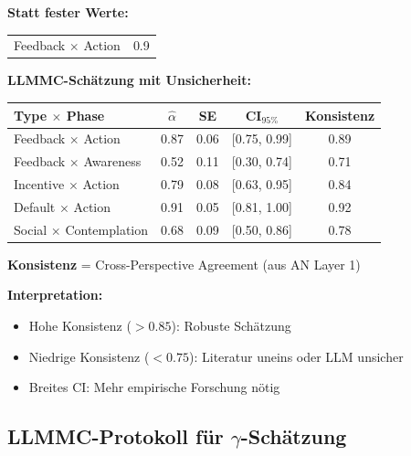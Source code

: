 \begin{tcolorbox}[colback=yellow!5!white, colframe=yellow!75!black,
    title=\textbf{Beispiel: LLMMC-geschätzte HHH-T5-Matrix (Phase-Affinity)}]

\textbf{Statt fester Werte:}
\begin{center}
\begin{tabular}{@{}lc@{}}
Feedback $\times$ Action & 0.9 \\
\end{tabular}
\end{center}

\textbf{LLMMC-Schätzung mit Unsicherheit:}
\begin{center}
\renewcommand{\arraystretch}{1.2}
\begin{tabular}{@{}lcccc@{}}
\toprule
\textbf{Type $\times$ Phase} & $\hat{\alpha}$ & SE & CI$_{95\%}$ & \textbf{Konsistenz} \\
\midrule
Feedback $\times$ Action & 0.87 & 0.06 & [0.75, 0.99] & 0.89 \\
Feedback $\times$ Awareness & 0.52 & 0.11 & [0.30, 0.74] & 0.71 \\
Incentive $\times$ Action & 0.79 & 0.08 & [0.63, 0.95] & 0.84 \\
Default $\times$ Action & 0.91 & 0.05 & [0.81, 1.00] & 0.92 \\
Social $\times$ Contemplation & 0.68 & 0.09 & [0.50, 0.86] & 0.78 \\
\bottomrule
\end{tabular}
\end{center}

\textbf{Konsistenz} = Cross-Perspective Agreement (aus AN Layer 1)

\textbf{Interpretation:}
\begin{itemize}[nosep]
    \item Hohe Konsistenz ($> 0.85$): Robuste Schätzung
    \item Niedrige Konsistenz ($< 0.75$): Literatur uneins oder LLM unsicher
    \item Breites CI: Mehr empirische Forschung nötig
\end{itemize}

\end{tcolorbox}

\subsection{LLMMC-Protokoll für $\gamma$-Schätzung}

